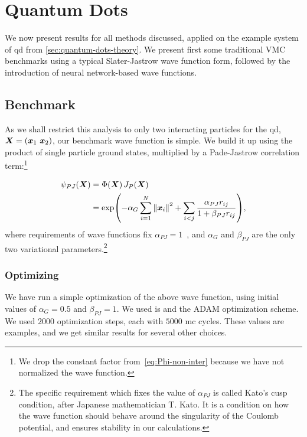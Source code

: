 \documentclass[Thesis.tex]{subfiles}
\begin{document}
\chapter{Quantum Dots}
\label{chp:quantum-dots}

\glsresetall

We now present results for all methods discussed, applied on the example system
of \gls{qd} from \cref{sec:quantum-dots-theory}. We present first some
traditional VMC benchmarks using a typical Slater-Jastrow wave function form,
followed by the introduction of neural network-based wave functions.

\section{Benchmark}

As we shall restrict this analysis to only two interacting particles for the \gls{qd},
$\bm{X} = (\bm{x}_1\ \bm{x}_2)$, our benchmark wave function is simple. We build
it up using the product of single particle ground states, multiplied
by a Pade-Jastrow correlation term:\footnote{We drop the constant factor from~\cref{eq:Phi-non-inter} because we have not normalized the wave function.}

\begin{align}
  \label{eq:qd-pade-jastrow-anzats}
  \psi_{PJ}(\bm{X}) &= \Phi(\bm{X}) \,J_P(\bm{X})\\
  &= \exp(-\alpha_G\sum_{i=1}^N \norm{\bm{x}_i}^2 + \sum_{i < j} \frac{\alpha_{PJ}
    r_{ij}}{1 + \beta_{PJ} r_{ij}}),
\end{align}
where requirements of wave functions fix $\alpha_{PJ} = 1$~\cite{Kato-1957}, and $\alpha_G$ and $\beta_{PJ}$
are the only two variational parameters.\footnote{The specific requirement which
fixes the value of $\alpha_{PJ}$ is called Kato's cusp condition, after Japanese
mathematician T. Kato. It is a condition
on how the wave function should behave around the singularity of the Coulomb
potential, and ensures stability in our calculations.}

\subsection{Optimizing}

We have run a simple optimization of the above wave function, using initial
values of $\alpha_G = 0.5$ and $\beta_{PJ} = 1$. We used \acrlong{is} and the
ADAM optimization scheme. We used $\num{2000}$ optimization steps, each with
$\num{5000}$ \gls{mc} cycles. These values are examples, and we get
similar results for several other choices.
\end{document}
